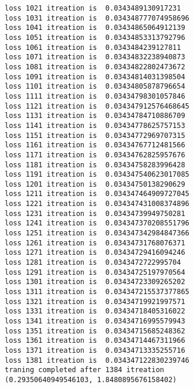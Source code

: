 \documentclass[11pt]{article}
\makeatletter
\newcommand{\boxspacing}{\kern\kvtcb@left@rule\kern\kvtcb@boxsep}
\newcommand{\prompt}[4]{
        \ttfamily\llap{{\color{#2}[#3]:\hspace{3pt}#4}}\vspace{-\baselineskip}
    }
\makeatother
\begin{document}
\begin{Verbatim}[commandchars=\\\{\}]
loss 1021 itreation is  0.0343489130917231
loss 1031 itreation is  0.034348777074958696
loss 1041 itreation is  0.03434865064912139
loss 1051 itreation is  0.03434853313792796
loss 1061 itreation is  0.0343484239127811
loss 1071 itreation is  0.03434832238940873
loss 1081 itreation is  0.03434822802473672
loss 1091 itreation is  0.03434814031398504
loss 1101 itreation is  0.03434805878796654
loss 1111 itreation is  0.03434798301057846
loss 1121 itreation is  0.034347912576468645
loss 1131 itreation is  0.03434784710886709
loss 1141 itreation is  0.03434778625757153
loss 1151 itreation is  0.03434772969707315
loss 1161 itreation is  0.03434767712481566
loss 1171 itreation is  0.03434762825957676
loss 1181 itreation is  0.03434758283996428
loss 1191 itreation is  0.034347540623017085
loss 1201 itreation is  0.03434750138290629
loss 1211 itreation is  0.034347464909727045
loss 1221 itreation is  0.034347431008374896
loss 1231 itreation is  0.03434739949750281
loss 1241 itreation is  0.034347370208551796
loss 1251 itreation is  0.034347342984847366
loss 1261 itreation is  0.03434731768076371
loss 1271 itreation is  0.03434729416094246
loss 1281 itreation is  0.0343472722995704
loss 1291 itreation is  0.03434725197970564
loss 1301 itreation is  0.03434723309265202
loss 1311 itreation is  0.034347215537377865
loss 1321 itreation is  0.03434719921997571
loss 1331 itreation is  0.03434718405316022
loss 1341 itreation is  0.03434716995579943
loss 1351 itreation is  0.03434715685248362
loss 1361 itreation is  0.03434714467311966
loss 1371 itreation is  0.03434713335255716
loss 1381 itreation is  0.034347122830239746
traning completed after 1384 itreation
(0.29350640949546103, 1.8480895676158402)
    \end{Verbatim}

    \begin{tcolorbox}[breakable, size=fbox, boxrule=1pt, pad at break*=1mm,colback=cellbackground, colframe=cellborder]
\prompt{In}{incolor}{ }{\boxspacing}
\begin{Verbatim}[commandchars=\\\{\}]

\end{Verbatim}
\end{tcolorbox}

    \begin{tcolorbox}[breakable, size=fbox, boxrule=1pt, pad at break*=1mm,colback=cellbackground, colframe=cellborder]
\prompt{In}{incolor}{ }{\boxspacing}
\begin{Verbatim}[commandchars=\\\{\}]

\end{Verbatim}
\end{tcolorbox}


    
    
    
\end{document}
